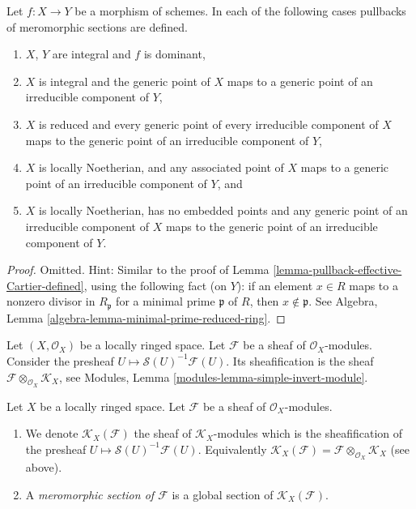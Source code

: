\begin{lemma}
\label{lemma-pullback-meromorphic-sections-defined}
Let $f : X \to Y$ be a morphism of schemes.
In each of the following cases pullbacks of meromorphic
sections are defined.
\begin{enumerate}
\item $X$, $Y$ are integral and $f$ is dominant,
\item $X$ is integral and the generic point of $X$ maps
to a generic point of an irreducible component of $Y$,
\item $X$ is reduced and every generic point of every irreducible
component of $X$ maps to the generic point of an irreducible component
of $Y$,
\item $X$ is locally Noetherian, and any associated point of
$X$ maps to a generic point of an irreducible component of $Y$, and
\item $X$ is locally Noetherian, has no embedded points and
any generic point of an irreducible component of
$X$ maps to the generic point of an irreducible component of $Y$.
\end{enumerate}
\end{lemma}

\begin{proof}
Omitted. Hint: Similar to the proof of
Lemma \ref{lemma-pullback-effective-Cartier-defined}, using
the following fact (on $Y$): if an element $x \in R$ maps to
a nonzero divisor in $R_{\mathfrak p}$ for a minimal prime
$\mathfrak p$ of $R$, then $x \not \in \mathfrak p$.
See Algebra, Lemma \ref{algebra-lemma-minimal-prime-reduced-ring}.
\end{proof}

\noindent
Let $(X, \mathcal{O}_X)$ be a locally ringed space.
Let $\mathcal{F}$ be a sheaf of $\mathcal{O}_X$-modules.
Consider the presheaf $U \mapsto \mathcal{S}(U)^{-1}\mathcal{F}(U)$.
Its sheafification is the sheaf
$\mathcal{F} \otimes_{\mathcal{O}_X} \mathcal{K}_X$, see
Modules, Lemma \ref{modules-lemma-simple-invert-module}.

\begin{definition}
\label{definition-meromorphic-section}
Let $X$ be a locally ringed space.
Let $\mathcal{F}$ be a sheaf of $\mathcal{O}_X$-modules.
\begin{enumerate}
\item We denote
$\mathcal{K}_X(\mathcal{F})$
the sheaf of $\mathcal{K}_X$-modules which is
the sheafification of the presheaf
$U \mapsto \mathcal{S}(U)^{-1}\mathcal{F}(U)$. Equivalently
$\mathcal{K}_X(\mathcal{F}) =
\mathcal{F} \otimes_{\mathcal{O}_X} \mathcal{K}_X$ (see above).
\item A {\it meromorphic section of $\mathcal{F}$}
is a global section of $\mathcal{K}_X(\mathcal{F})$.
\end{enumerate}
\end{definition}

